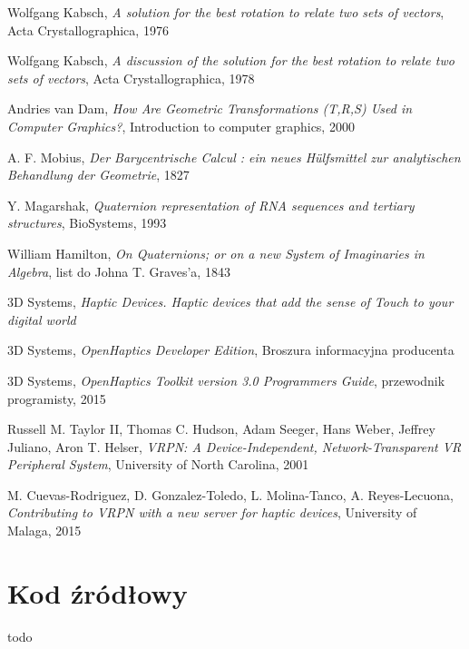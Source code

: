 \documentclass[licencjacka]{pracamgr}
\begin{document}
\begin{thebibliography}{99}
 Wolfgang Kabsch, \textit{A solution for the best rotation to relate two sets of vectors}, Acta Crystallographica, 1976

 Wolfgang Kabsch, \textit{A discussion of the solution for the best rotation to relate two sets of vectors}, Acta Crystallographica, 1978

 Andries van Dam, \textit{How Are Geometric
Transformations (T,R,S) Used in Computer Graphics?}, Introduction to computer graphics, 2000

 A. F. Mobius, \textit{Der Barycentrische Calcul : ein neues Hülfsmittel zur analytischen Behandlung der Geometrie}, 1827

 Y. Magarshak, \textit{Quaternion representation of RNA sequences and tertiary structures}, BioSystems, 1993

 William Hamilton, \textit{On Quaternions; or on a new System of Imaginaries in Algebra}, list do Johna T. Graves'a, 1843

 3D Systems, \textit{Haptic Devices. Haptic devices that add the sense of Touch to your digital world}

 3D Systems, \textit{OpenHaptics Developer Edition}, Broszura informacyjna producenta

 3D Systems, \textit{OpenHaptics Toolkit version 3.0 Programmers Guide}, przewodnik programisty, 2015

 Russell M. Taylor II, Thomas C. Hudson, Adam Seeger, Hans Weber, Jeffrey Juliano, Aron T. Helser, \textit{VRPN: A Device-Independent, Network-Transparent VR Peripheral System}, University of North Carolina, 2001

 M. Cuevas-Rodriguez, D. Gonzalez-Toledo, L. Molina-Tanco, A. Reyes-Lecuona, \textit{Contributing to VRPN with a new server for haptic devices}, University of Malaga, 2015

\end{thebibliography}

\chapter*{Kod źródłowy}
todo
\end{document}
